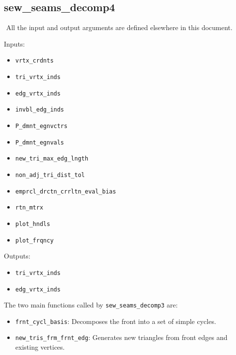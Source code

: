 \documentclass[11pt]{amsart}
\begin{document}
\subsection*{sew\_seams\_decomp4}$ $
All the input and output arguments are defined elsewhere in this document.

\noindent
Inputs:
\begin{itemize}
\item
\verb+vrtx_crdnts+
\item
\verb+tri_vrtx_inds+
\item
\verb+edg_vrtx_inds+
\item
\verb+invbl_edg_inds+
\item
\verb+P_dmnt_egnvctrs+
\item
\verb+P_dmnt_egnvals+
\item
\verb+new_tri_max_edg_lngth+
\item
\verb+non_adj_tri_dist_tol+
\item
\verb+emprcl_drctn_crrltn_eval_bias+
\item
\verb+rtn_mtrx+
\item
\verb+plot_hndls+
\item
\verb+plot_frqncy+
\end{itemize}

\noindent
Outputs:
\begin{itemize}
\item
\verb+tri_vrtx_inds+
\item
\verb+edg_vrtx_inds+
\end{itemize}

The two main functions called by \verb+sew_seams_decomp3+ are:
\begin{itemize}
\item
\verb+frnt_cycl_basis+: Decomposes the front into a set of simple cycles.
\item
\verb+new_tris_frm_frnt_edg+: Generates new triangles from front edges and existing vertices. 
\end{itemize}
\end{document}
